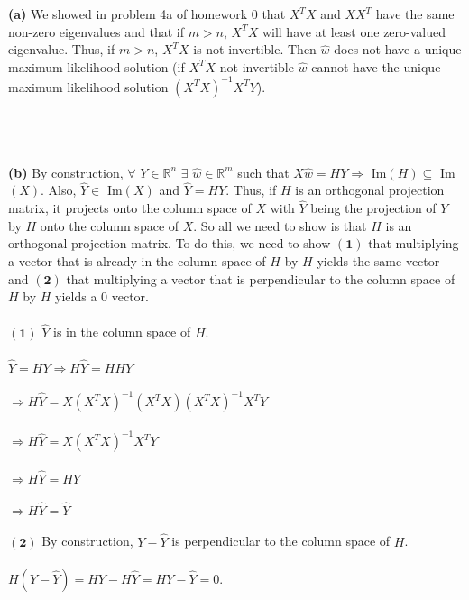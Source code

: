 \documentclass[submit]{harvardml}
\newcommand{\R}{\mathbb{R}}
\begin{document}
\textbf{(a)} We showed in problem 4a of homework 0 that $X^TX$ and $XX^T$ have the same non-zero eigenvalues and that if $m>n$, $X^TX$ will have at least one zero-valued eigenvalue. Thus, if $m>n$, $X^TX$ is not invertible. Then $\hat w$ does not have a unique maximum likelihood solution (if $X^TX$ not invertible $\hat w$ cannot have the unique maximum likelihood solution $(X^TX)^{-1}X^TY$).\\\\\\\

\textbf{(b)} By construction, $\forall$ $Y\in\R^n$ $\exists$ $\hat w\in\R^m$ such that $X\hat w=HY \Rightarrow$ Im$(H)\subseteq$ Im$(X)$. Also, $\hat Y\in$ Im$(X)$ and $\hat Y=HY$. Thus, if $H$ is an orthogonal projection matrix, it projects onto the column space of $X$ with $\hat Y$ being the projection of $Y$ by $H$ onto the column space of $X$. So all we need to show is that $H$ is an orthogonal projection matrix. To do this, we need to show $\mathbf{(1)}$ that multiplying a vector that is already in the column space of $H$ by $H$ yields the same vector and $\mathbf{(2)}$ that multiplying a vector that is perpendicular to the column space of $H$ by $H$ yields a $0$ vector.\\\\
$\mathbf{(1)}$ $\hat Y$ is in the column space of $H$.\\\\
$\hat Y=HY\Rightarrow H\hat Y=HHY$\\\\
$\Rightarrow H\hat Y=X(X^TX)^{-1}(X^TX)(X^TX)^{-1}X^TY$\\\\
$\Rightarrow H\hat Y=X(X^TX)^{-1}X^TY$\\\\
$\Rightarrow H\hat Y=HY$\\\\
$\Rightarrow H\hat Y=\hat Y$\\\\
$\mathbf{(2)}$ By construction, $Y-\hat Y$ is perpendicular to the column space of $H$.\\\\
$H(Y-\hat Y)=HY-H\hat Y=HY-\hat Y=0$.\\\\\\
\end{document}
